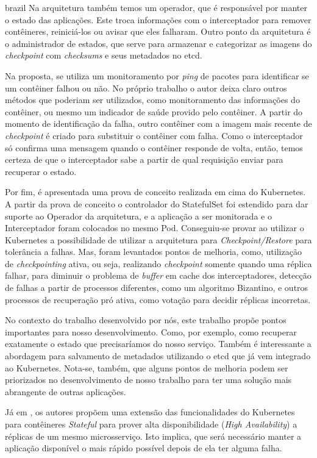\begin{otherlanguage*}{brazil}
Na arquitetura também temos um operador, que é responsável por manter o
estado das aplicações. Este troca informações com o interceptador para remover
contêineres, reiniciá-los ou avisar que eles falharam. Outro ponto da
arquitetura é o administrador de estados, que serve para armazenar e categorizar
as imagens do \textit{checkpoint} com \textit{checksums} e seus metadados no etcd.

Na proposta, se utiliza um monitoramento por \textit{ping} de pacotes para
identificar se um contêiner falhou ou não. No próprio trabalho o autor deixa
claro outros métodos que poderiam ser utilizados, como monitoramento das
informações do contêiner, ou mesmo um indicador de saúde provido pelo contêiner.
A partir do momento de identificação da falha, outro contêiner com a imagem
mais recente de \textit{checkpoint} é criado para substituir o contêiner
com falha. Como o interceptador só confirma uma mensagem quando o contêiner
responde de volta, então, temos certeza de que o interceptador sabe a partir
de qual requisição enviar para recuperar o estado.

Por fim, é apresentada uma prova de conceito realizada em cima do Kubernetes.
A partir da prova de conceito o controlador do StatefulSet foi estendido para
dar suporte ao Operador da arquitetura, e a aplicação a ser monitorada e o
Interceptador foram colocados no mesmo Pod. Conseguiu-se provar ao utilizar o
Kubernetes a possibilidade de utilizar a arquitetura para
\textit{Checkpoint/Restore} para tolerância a falhas. Mas, foram levantados
pontos de melhoria, como, utilização de \textit{checkpointing} ativa, ou seja,
realizando \textit{checkpoint} somente quando uma réplica falhar, para diminuir
o problema de \textit{buffer} em cache dos interceptadores, detecção de falhas
a partir de processos diferentes, como um algoritmo Bizantino, e outros
processos de recuperação pró ativa, como votação para decidir réplicas incorretas.

No contexto do trabalho desenvolvido por nós, este trabalho propõe pontos
importantes para nosso desenvolvimento. Como, por exemplo, como recuperar
exatamente o estado que precisaríamos do nosso serviço. Também é interessante
a abordagem para salvamento de metadados utilizando o etcd que já vem integrado
ao Kubernetes. Nota-se, também, que alguns pontos de melhoria podem ser
priorizados no desenvolvimento de nosso trabalho para ter uma solução mais
abrangente de outras aplicações.

Já em \cite{vayghan2021kubernetes}, os autores propõem uma extensão das
funcionalidades do Kubernetes para contêineres \textit{Stateful} para
prover alta disponibilidade (\textit{High Availability}) a réplicas de um mesmo
microsserviço. Isto implica, que será necessário manter a aplicação disponível
o mais rápido possível depois de ela ter alguma falha.


\end{otherlanguage*}
